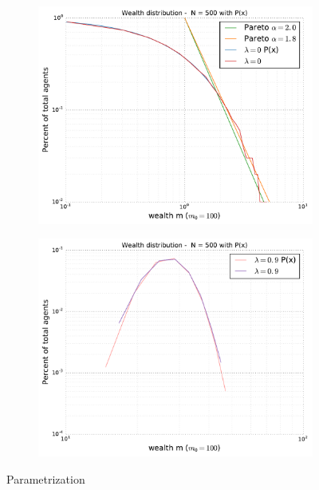 \documentclass[10pt, a4paper]{amsart}
\begin{document}
\begin{figure}
\begin{subfigure}{.5\textwidth}
  \centering
  \includegraphics[width=\linewidth]{../figures/5ac/5c_parameterization0.pdf}
  \caption{}
  \label{fig:paramfig1}
\end{subfigure}%
\begin{subfigure}{.5\textwidth}
  \centering
  \includegraphics[width=\linewidth]{../figures/5ac/5c_parameterization09.pdf}
  \caption{}
  \label{fig:paramfig2}
\end{subfigure}
\caption{Parametrization}
\label{fig:paramfig}
\end{figure}
\end{document}
